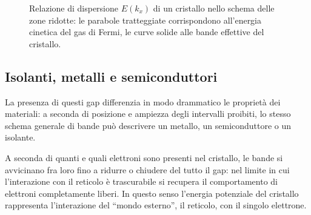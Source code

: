 \begin{figure}[H]
    \caption{Relazione di dispersione \( E(k_x) \) di un cristallo nello schema delle zone ridotte: le parabole tratteggiate corrispondono all'energia cinetica del gas di Fermi, le curve solide alle bande effettive del cristallo.}
    \label{fig:bande_cristallo}
\end{figure}

\subsection{Isolanti, metalli e semiconduttori}

La presenza di questi gap differenzia in modo drammatico le proprietà dei materiali: a seconda di posizione e ampiezza degli intervalli proibiti, lo stesso schema generale di bande può descrivere un metallo, un semiconduttore o un isolante.

A seconda di quanti e quali elettroni sono presenti nel cristallo, le bande si avvicinano fra loro fino a ridurre o chiudere del tutto il gap: nel limite in cui l'interazione con il reticolo è trascurabile si recupera il comportamento di elettroni completamente liberi. In questo senso l'energia potenziale del cristallo rappresenta l'interazione del ``mondo esterno'', il reticolo, con il singolo elettrone.

